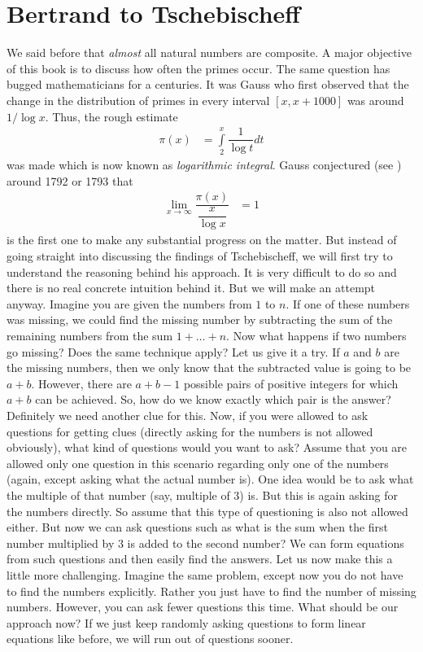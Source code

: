 \documentclass[elemannt.tex]{subfile}
\begin{document}
	\chapter{Bertrand to Tschebischeff}
	We said before that \textit{almost} all natural numbers are composite. A major objective of this book is to discuss how often the primes occur. The same question has bugged mathematicians for a centuries. It was Gauss who first observed that the change in the distribution of primes in every interval $[x,x+1000]$ was around $1/\log{x}$. Thus, the rough estimate
		\begin{align*}
			\pi(x)
				& = \int\limits_{2}^{x}\dfrac{1}{\log{t}}dt
		\end{align*}
	was made which is now known as \textit{logarithmic integral}. Gauss conjectured (see \textcite[Page 37]{landau_1911}) around 1792 or 1793 that
		\begin{align*}
			\lim\limits_{x\to\infty}\dfrac{\pi(x)}{\dfrac{x}{\log{x}}}
				& = 1
		\end{align*}
	\textcite{tchebycheff_1852} is the first one to make any substantial progress on the matter. But instead of going straight into discussing the findings of Tschebischeff, we will first try to understand the reasoning behind his approach. It is very difficult to do so and there is no real concrete intuition behind it. But we will make an attempt anyway. Imagine you are given the numbers from $1$ to $n$. If one of these numbers was missing, we could find the missing number by subtracting the sum of the remaining numbers from the sum $1+\ldots+n$. Now what happens if two numbers go missing? Does the same technique apply? Let us give it a try. If $a$ and $b$ are the missing numbers, then we only know that the subtracted value is going to be $a+b$. However, there are $a+b-1$ possible pairs of positive integers for which $a+b$ can be achieved. So, how do we know exactly which pair is the answer? Definitely we need another clue for this. Now, if you were allowed to ask questions for getting clues (directly asking for the numbers is not allowed obviously), what kind of questions would you want to ask? Assume that you are allowed only one question in this scenario regarding only one of the numbers (again, except asking what the actual number is). One idea would be to ask what the multiple of that number (say, multiple of $3$) is. But this is again asking for the numbers directly. So assume that this type of questioning is also not allowed either. But now we can ask questions such as what is the sum when the first number multiplied by $3$ is added to the second number? We can form equations from such questions and then easily find the answers. Let us now make this a little more challenging. Imagine the same problem, except now you do not have to find the numbers explicitly. Rather you just have to find the number of missing numbers. However, you can ask fewer questions this time. What should be our approach now? If we just keep randomly asking questions to form linear equations like before, we will run out of questions sooner.
\end{document}
